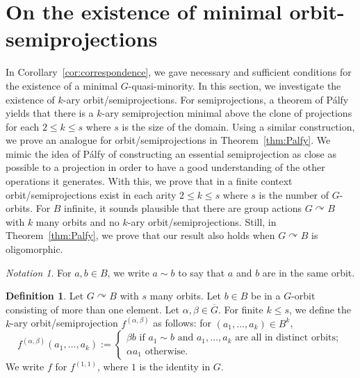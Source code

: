 \documentclass{article}
\theoremstyle{remark}
\newtheorem{notation}[theorem]{Notation}
\theoremstyle{definition}
\newtheorem{definition}[theorem]{Definition}
\def\acts{\curvearrowright}
\begin{document}
\section{On the existence of minimal orbit-semiprojections}\label{sec:palfy}
In Corollary~\ref{cor:correspondence}, we gave necessary and sufficient conditions for the existence of a minimal $G$-quasi-minority. In this section, we investigate the existence of $k$-ary orbit\-/semiprojections. For semiprojections, a theorem of P\'{a}lfy~\cite{palfy1986arity} yields that there is a $k$-ary semiprojection minimal above the clone of projections for each $2\leq k\leq s$ where $s$ is the size of the domain. Using a similar construction, we prove an analogue for orbit\-/semiprojections in Theorem~\ref{thm:Palfy}. We mimic the idea of P\'{a}lfy of constructing an essential semiprojection as close as possible to a projection in order to have a good understanding of the other operations it generates. With this, we prove that in a finite context orbit\-/semiprojections exist in each arity $2\leq k\leq s$ where $s$ is the number of $G$-orbits. For $B$ infinite, it sounds plausible that there are group actions $G\acts B$ with $k$ many orbits and no $k$-ary orbit\-/semiprojections. Still, in Theorem~\ref{thm:Palfy}, we prove that our result also holds when $G\acts B$ is oligomorphic. 

\begin{notation} For $a,b\in B$, we write $a\sim b$ to say that $a$ and $b$ are in the same orbit.
\end{notation}


\begin{definition}\label{def:palfy} Let $G\acts B$ with $s$ many orbits. Let $b\in B$ be in a $G$-orbit consisting of more than one element. Let {$\alpha,\beta\in\overline{G}$.} For finite $k\leq s$, we define the $k$-ary orbit\-/semiprojection $f^{(\alpha, \beta)}$ as follows: for $(a_1, \dots, a_k)\in B^k$, 
\begin{equation*}
 f^{(\alpha, \beta)}(a_1, \dots, a_k):=
    \begin{cases}
       \beta b \text{ if } a_1\sim b \text{ and } a_1, \dots, a_k \text{ are all in distinct orbits};\\
        \alpha a_1 \text{ otherwise.}
        \end{cases}
        \end{equation*}
We write $f$ for $f^{(1, 1)}$, where $1$ is the identity in $G$.
\end{definition}
\end{document}
